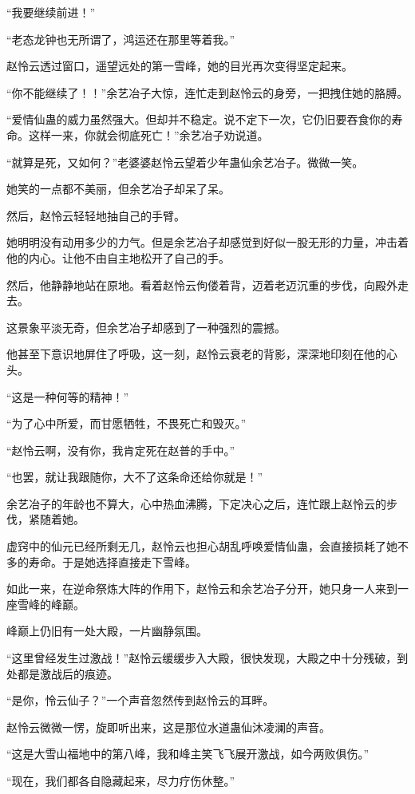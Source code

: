 \begin{this_body}
“我要继续前进！”

“老态龙钟也无所谓了，鸿运还在那里等着我。”

赵怜云透过窗口，遥望远处的第一雪峰，她的目光再次变得坚定起来。

“你不能继续了！！”余艺冶子大惊，连忙走到赵怜云的身旁，一把拽住她的胳膊。

“爱情仙蛊的威力虽然强大。但却并不稳定。说不定下一次，它仍旧要吞食你的寿命。这样一来，你就会彻底死亡！”余艺冶子劝说道。

“就算是死，又如何？”老婆婆赵怜云望着少年蛊仙余艺冶子。微微一笑。

她笑的一点都不美丽，但余艺冶子却呆了呆。

然后，赵怜云轻轻地抽自己的手臂。

她明明没有动用多少的力气。但是余艺冶子却感觉到好似一股无形的力量，冲击着他的内心。让他不由自主地松开了自己的手。

然后，他静静地站在原地。看着赵怜云佝偻着背，迈着老迈沉重的步伐，向殿外走去。

这景象平淡无奇，但余艺冶子却感到了一种强烈的震撼。

他甚至下意识地屏住了呼吸，这一刻，赵怜云衰老的背影，深深地印刻在他的心头。

“这是一种何等的精神！”

“为了心中所爱，而甘愿牺牲，不畏死亡和毁灭。”

“赵怜云啊，没有你，我肯定死在赵普的手中。”

“也罢，就让我跟随你，大不了这条命还给你就是！”

余艺冶子的年龄也不算大，心中热血沸腾，下定决心之后，连忙跟上赵怜云的步伐，紧随着她。

虚窍中的仙元已经所剩无几，赵怜云也担心胡乱呼唤爱情仙蛊，会直接损耗了她不多的寿命。于是她选择直接走下雪峰。

如此一来，在逆命祭炼大阵的作用下，赵怜云和余艺冶子分开，她只身一人来到一座雪峰的峰巅。

峰巅上仍旧有一处大殿，一片幽静氛围。

“这里曾经发生过激战！”赵怜云缓缓步入大殿，很快发现，大殿之中十分残破，到处都是激战后的痕迹。

“是你，怜云仙子？”一个声音忽然传到赵怜云的耳畔。

赵怜云微微一愣，旋即听出来，这是那位水道蛊仙沐凌澜的声音。

“这是大雪山福地中的第八峰，我和峰主笑飞飞展开激战，如今两败俱伤。”

“现在，我们都各自隐藏起来，尽力疗伤休整。”


\end{this_body}
